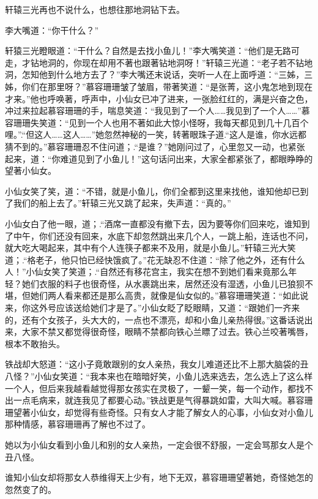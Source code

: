 \documentclass[12pt,oneside]{book}
\begin{document}
轩辕三光再也不说什么，也想往那地洞钻下去。

李大嘴道：``你干什么？''

轩猿三光瞪眼道：``干什么？自然是去找小鱼儿！''李大嘴笑道：``他们是无路可走，才钻地洞的，你现在却用不著也跟著钻地洞呀！''轩辕三光道：``老子若不钻地洞，怎知他到什么地方去了？''李大嘴还末说话，突听一人在上面呼道：``三姊，三姊，你们在那里呀？''慕容珊珊皱了皱眉，带著笑道：``是张菁，这小鬼怎地到现在才来。''他也呼唤著，呼声中，小仙女已冲了进来，一张脸红红的，满是兴奋之色，冲过来拉起慕容珊珊的手，喘息笑道：``我见到了一个人\ldots\ldots 我见到了一个人\ldots\ldots{}''慕容珊珊失笑道：``见到一个人也用不著如此大惊小怪呀，我每天都见到几十几百个哩。''.``但这人\ldots\ldots 这人\ldots\ldots{}''她忽然神秘的一笑，转著眼珠子道.``这人是谁，你水远都猜不到的。''慕容珊珊忍不住问道；.``是谁？''她刚问过了，心里忽又一动，也紧张起来，道：``你难道见到了小鱼儿！''这句话问出来，大家全都紧张了，都眼睁睁的望著小仙女。

小仙女笑了笑，道：``不错，就是小鱼儿，你们全都到这里来找他，谁知他却已到了我们的船上去了。''轩辕三光又跳了起来，失声道：``真的。''

小仙女白了他一眼，道；.``酒席一直都没有撤下去，因为要等你们回来吃，谁知到了中午，你们还没有回来，水底下却忽然跳出来几个人，一跳上船，连话也不问，就大吃大喝起来，其中有个人连筷子都来不及用，就是小鱼儿。''轩辕三光大笑道；.``格老子，他只怕已经快饿疯了。''花无缺忍不住道：``除了他之外，还有什么人！''小仙女笑了笑道；.``自然还有移花宫主，我实在想不到她们看来竟那么年轻？她们衣服的料子也很奇怪，从水裹跳出来，居然还没有湿透，小鱼儿已狼狈不堪，但她们两人看来都还是那么高贵，就像是仙女似的。''慕容珊珊笑道：``如此说来，你这外号应该送给她们才是了。''小仙女眨了眨眼睛，又道：``跟她们一齐来的，还有个女孩子，头大大的，一点也不漂亮，却和小鱼儿亲热得很。''这番话说出来，大家不禁又都觉得很奇怪，眼睛不禁都向铁心兰瞟了过去。铁心兰咬著嘴唇，根本不敢抬头。

铁战却大怒道：``这小子竟敢跟别的女人亲热，我女儿难道还比不上那大脑袋的丑八怪？''小仙女笑道：``我本来也在暗暗好笑，小鱼儿选来选去，怎么选上了这么样一个人，但后来我越看越觉得那女孩实在灵极了，一颦一笑，每一个动作，都找不出一点毛病来，就连我见了都要心动。''铁战更是气得暴跳如雷，大叫大喊。慕容珊珊望著小仙女，却觉得有些奇怪。只有女人才能了解女人的心事，小仙女对小鱼儿那种情感，慕容珊珊再了解也不过了。

她以为小仙女看到小鱼儿和别的女人亲热，一定会很不舒服，一定会骂那女人是个丑八怪。

谁知小仙女却将那女人恭维得天上少有，地下无双，慕容珊珊望著她，奇怪她怎的忽然变了的。
\end{document}
